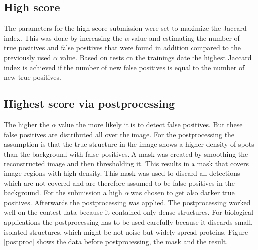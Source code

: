 \subsection{High score}
The parameters for the high score submission were set to maximize the Jaccard index. This was done by increasing the $\alpha$ value and estimating the number of true positives and false positives that were found in addition compared to the previously used $\alpha$ value. Based on tests on the trainings date the highest Jaccard index is achieved if the number of new false positives is equal to the number of new true positives. 
\subsection{Highest score via postprocessing}
The higher the $\alpha$ value the more likely it is to detect false positives. But these false positives are distributed all over the image. For the postprocessing the assumption is that the true structure in the image shows a higher density of spots than the background with false positives. A mask was created by smoothing the reconstructed image and then thresholding it. This results in a mask that covers image regions with high density. This mask was used to discard all detections which are not covered and are therefore assumed to be false positives in the background.\newline
For the submission a high $\alpha$ was chosen to get also darker true positives. Afterwards the postprocessing was applied. The postprocessing worked well on the contest data because it contained only dense structures. For biological applications the postprocessing has to be used carefully because it discards small, isolated structures, which might be not noise but widely spread proteins.\newline
Figure \ref{postproc} shows the data before postprocessing, the mask and the result.

